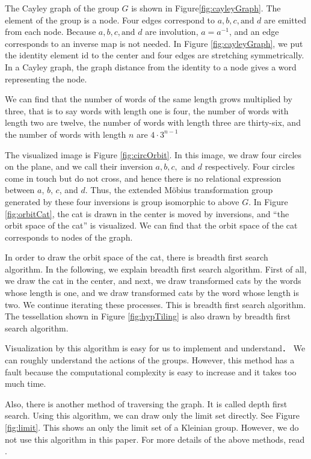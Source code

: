 The Cayley graph of the group $G$ is shown in Figure\ref{fig:cayleyGraph}. 
The element of the group is a node. Four edges correspond to 
$a, b, c, \text{and~} d$ are emitted from each node.
Because $a, b, c, \text{and~} d$ are involution, $a=a^{-1}$, and
an edge corresponds to an inverse map is not needed.
In Figure \ref{fig:cayleyGraph}, we put the identity element $\mathrm{id}$
to the center and four edges are stretching symmetrically.
In a Cayley graph, the graph distance from the identity to a node gives 
a word representing the node.

We can find that the number of words of the same length grows multiplied by three, 
that is to say words with length one is four, the number of words with length two are
twelve, the number of words with length three are thirty-six, and the
number of words with length $n$ are $4 \cdot 3^{n-1}$

The visualized image is Figure \ref{fig:circOrbit}. In this image,
we draw four circles on the plane, and we call their inversion
$a, b, c,$ and $ d$ respectively. Four circles come in touch but do not cross,
and hence there is no relational expression between $a$, $b$, $c$, and $d$.
Thus, the extended M\"obius transformation group generated by these four inversions
is group isomorphic to above $G$.
In Figure \ref{fig:orbitCat}, the cat is drawn in the center is moved by
inversions, and ``the orbit space of the cat'' is visualized.
We can find that the orbit space of the cat corresponds to nodes of
the graph.

In order to draw the orbit space of the cat, there is breadth first search
algorithm.
In the following, we explain breadth first search algorithm.
First of all, we draw the cat in the center, and
next, we draw transformed cats by the words whose length is one,
and we draw transformed cats by the word whose length is two.
We continue iterating these processes.
This is breadth first search algorithm.
The tessellation shown in Figure \ref{fig:hypTiling} is also drawn by
breadth first search algorithm.

Visualization by this algorithm is easy for us to implement and understand．
We can roughly understand the actions of the groups.
However, this method has a fault because the computational complexity is 
easy to increase and it takes too much time.

Also, there is another method of traversing the graph.
It is called depth first search.
Using this algorithm, we can draw only the limit set directly.
See Figure \ref{fig:limit}. This shows an only the limit set of a Kleinian
group.
However, we do not use this algorithm in this paper.
For more details of the above methods, read \cite{MumfordSeriesWright200204}.

